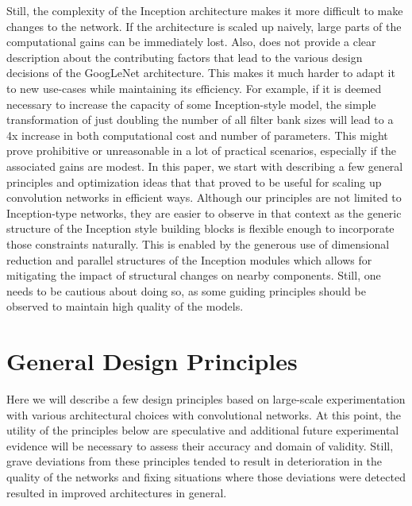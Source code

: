 \documentclass[10pt,twocolumn,letterpaper]{article}
\begin{document}
Still, the complexity of the Inception architecture makes
it more difficult to make changes to the network. If the architecture is
scaled up naively, large parts of the computational gains can be immediately
lost. Also, \cite{szegedy2015going} does not provide a clear description
about the contributing factors that lead to the various design decisions
of the GoogLeNet architecture. This makes it much harder to adapt it to new
use-cases while maintaining its efficiency. For example, if it is deemed
necessary to increase the capacity of some Inception-style model, the simple
transformation of just doubling the number of all filter bank sizes
will lead to a 4x increase in both computational cost and
number of parameters. This might prove prohibitive or unreasonable
in a lot of practical scenarios, especially if the associated gains
are modest. In this paper, we start with describing a few general
principles and optimization ideas that that proved to be useful for scaling up
convolution networks in efficient ways. Although our principles
are not limited to Inception-type networks, they are easier to observe
in that context as the generic structure of the Inception style building
blocks is flexible enough to incorporate those constraints naturally.
This is enabled by the generous use of dimensional reduction and
parallel structures of the Inception modules which allows for mitigating
the impact of structural changes on nearby components.
Still, one needs to be cautious about doing so, as some guiding principles
should be observed to maintain high quality of the models.
 \section{General Design Principles}
\label{principles}
Here we will describe a few design principles based on large-scale experimentation with various architectural choices with convolutional networks. At this point, the utility of the principles below are speculative and additional future experimental evidence will be necessary to assess their accuracy and domain of validity. Still, grave deviations from these principles tended to result in deterioration in the quality of the networks and fixing situations where those deviations were detected resulted in improved architectures in general.
\end{document}
